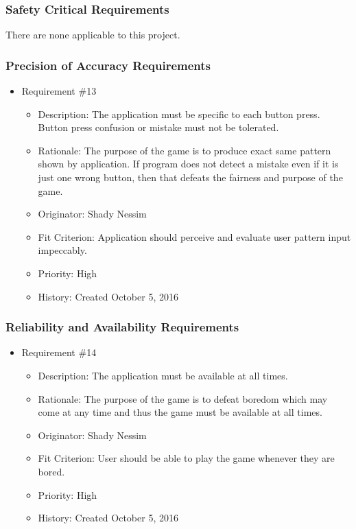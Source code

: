 \documentclass[12pt, titlepage]{article}
\begin{document}
\subsubsection{Safety Critical Requirements}
There are none applicable to this project.

\subsubsection{Precision of Accuracy Requirements}
\begin{itemize}

\item Requirement \#13 
\begin{itemize} 
\item Description: The application must be specific to each button press. Button press confusion or mistake must not be tolerated.
\item Rationale: The purpose of the game is to produce exact same pattern shown by application. If program does not detect a mistake even if it is just one wrong button, then that defeats the fairness and purpose of the game.
\item Originator: Shady Nessim 
\item Fit Criterion: Application should perceive and evaluate user pattern input impeccably.
\item Priority: High 
\item History: Created October 5, 2016
\end{itemize}

\end{itemize}

\subsubsection{Reliability and Availability Requirements}
\begin{itemize} 

\item Requirement \#14 
\begin{itemize} 
\item Description: The application must be available at all times.
\item Rationale: The purpose of the game is to defeat boredom which may come at any time and thus the game must be available at all times.
\item Originator: Shady Nessim 
\item Fit Criterion: User should be able to play the game whenever they are bored.
\item Priority: High 
\item History: Created October 5, 2016
\end{itemize}

\end{itemize}
\end{document}
